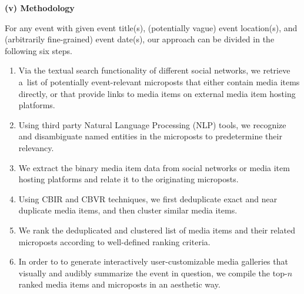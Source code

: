 \begin{abstracts}
\textbf{(v) Methodology}

For any event with given event title(s),
(potentially vague) event location(s), and
(arbitrarily fine-grained) event date(s), 
our approach can be divided in the following six steps.

\begin{enumerate}
  \item Via the textual search functionality of
        different social networks,
        we retrieve a~list of potentially event-relevant
        microposts that either contain media items directly,
        or that provide links to media items
        on external media item hosting platforms.
  \item Using third party
        Natural Language Processing (NLP) tools,
        we recognize and disambiguate named entities
        in the microposts to predetermine their relevancy.
  \item We extract the binary media item data
        from social networks or media item hosting platforms
        and relate it to the originating microposts.
  \item Using CBIR and CBVR techniques, we first deduplicate
        exact and near duplicate media items,
        and then cluster similar media items.
  \item We rank the deduplicated and clustered list
        of media items and their related microposts
        according to well-defined ranking criteria.
  \item In order to to generate interactively user-customizable
        media galleries that visually and audibly summarize the
        event in question, we compile the top-$n$ ranked
        media items and microposts in an aesthetic way.
\end{enumerate}
\end{abstracts}
